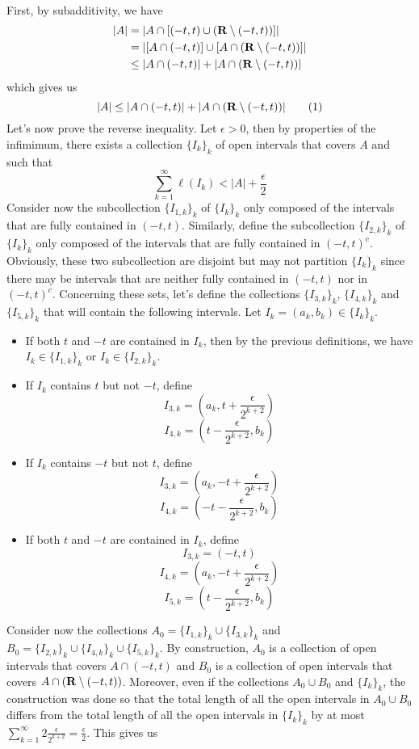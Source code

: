 \begin{solution}
    \\ First, by subadditivity, we have
    \begin{align*}
        |A| &= |A\cap [(-t, t) \cup (\mathbf{R} \setminus (-t, t))]|\\
        &= |[A \cap (-t, t)]\cup [A \cap (\mathbf{R} \setminus (-t, t))]| \\
        &\leq |A \cap (-t, t)| + |A \cap (\mathbf{R} \setminus (-t, t))|
    \end{align*}
    which gives us
    \[|A| \leq |A \cap (-t, t)| + |A \cap (\mathbf{R} \setminus (-t, t))| \tag*{(1)}\]
    Let's now prove the reverse inequality. Let $\epsilon > 0$, then by properties of the infimimum, there exists a collection $\{I_k\}_k$ of open intervals that covers $A$ and such that
    $$\sum_{k=1}^{\infty}\ell(I_k) < |A| + \frac{\epsilon}{2}$$
    Consider now the subcollection $\{I_{1, k}\}_k$ of $\{I_k\}_k$ only composed of the intervals that are fully contained in $(-t, t)$. Similarly, define the subcollection $\{I_{2, k}\}_k$ of $\{I_k\}_k$ only composed of the intervals that are fully contained in $(-t, t)^c$. Obviously, these two subcollection are disjoint but may not partition $\{I_k\}_k$ since there may be intervals that are neither fully contained in $(-t, t)$ nor in $(-t, t)^c$. Concerning these sets, let's define the collections $\{I_{3, k}\}_k$, $\{I_{4, k}\}_k$ and $\{I_{5, k}\}_k$ that will contain the following intervals. Let $I_k = (a_k, b_k) \in \{I_k\}_k$.
    \begin{itemize}
        \item If both $t$ and $-t$ are contained in $I_k$, then by the previous definitions, we have $I_k \in \{I_{1,k}\}_k$ or $I_k \in \{I_{2,k}\}_k$.
        \item If $I_k$ contains $t$ but not $-t$, define 
        $$I_{3,k} = \left(a_k, t + \frac{\epsilon}{2^{k+2}} \right)$$
        $$I_{4,k} = \left(t - \frac{\epsilon}{2^{k+2}}, b_k\right)$$
        \item If $I_k$ contains $-t$ but not $t$, define
        $$I_{3,k} = \left(a_k, -t + \frac{\epsilon}{2^{k+2}} \right)$$
        $$I_{4,k} = \left(-t - \frac{\epsilon}{2^{k+2}}, b_k\right)$$
        \item If both $t$ and $-t$ are contained in $I_k$, define
        $$I_{3,k} = \left(-t, t\right)$$
        $$I_{4,k} = \left(a_k, -t + \frac{\epsilon}{2^{k+2}} \right)$$
        $$I_{5,k} = \left(t - \frac{\epsilon}{2^{k+2}}, b_k\right)$$
    \end{itemize}
    Consider now the collections $A_0 = \{I_{1,k}\}_k \cup \{I_{3,k}\}_k$ and $B_0 = \{I_{2,k}\}_k \cup \{I_{4,k}\}_k \cup \{I_{5,k}\}_k$. By construction, $A_0$ is a collection of open intervals that covers $A \cap (-t, t)$ and $B_0$ is a collection of open intervals that covers $A \cap (\mathbf{R} \setminus (-t, t))$. Moreover, even if the collections $A_0 \cup B_0$ and $\{I_k\}_k$, the construction was done so that the total length of all the open intervals in $A_0 \cup B_0$ differs from the total length of all the open intervals in $\{I_k\}_k$ by at most $\sum_{k=1}^{\infty}2\frac{\epsilon}{2^{k+2}} = \frac{\epsilon}{2}$. This gives us

\end{solution}
